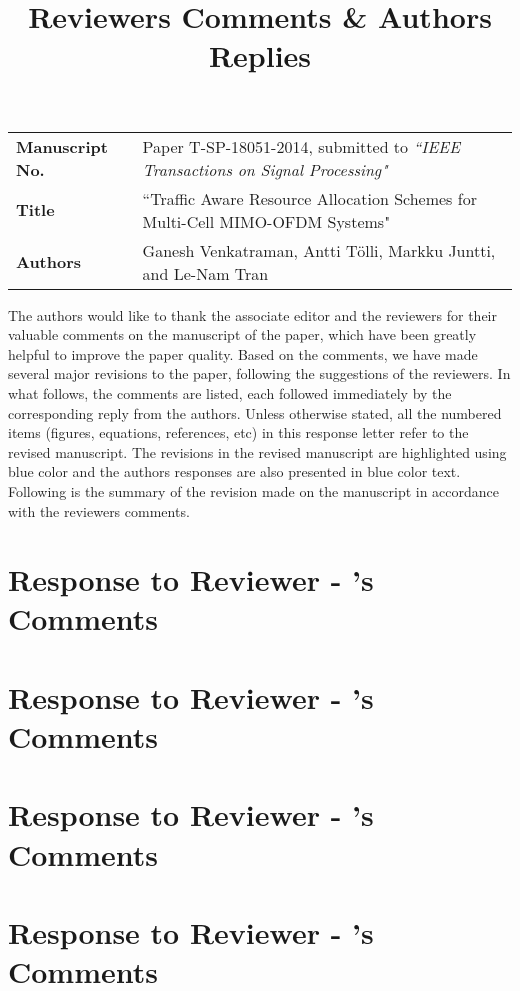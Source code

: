 \documentclass[10pt,letterpaper,onecolumn]{article}
\begin{document}
\title{Reviewers Comments \& Authors Replies}

\date{}
\author{}
\maketitle

\begin{tabular}{p{1.5in}p{4in}}
\textbf{Manuscript No.} & Paper T-SP-18051-2014, submitted to \emph{``IEEE Transactions on Signal Processing"} \\
\textbf{Title} & ``Traffic Aware Resource Allocation Schemes for Multi-Cell MIMO-OFDM Systems" \\
\textbf{Authors} & Ganesh Venkatraman, Antti T\"{o}lli, Markku Juntti, and Le-Nam Tran
\end{tabular}

\vspace{0.5in}
The authors would like to thank the associate editor and the reviewers for their valuable comments on the manuscript of the paper, which have been greatly helpful to improve the paper quality. Based on the comments, we have made several major revisions to the paper, following the suggestions of the reviewers. In what follows, the comments are listed, each followed immediately by the corresponding reply from the authors. Unless otherwise stated, all the numbered items (figures, equations, references, etc) in this response letter refer to the revised manuscript. The revisions in the revised manuscript are highlighted using blue color and the authors responses are also presented in blue color text. Following is the summary of the revision made on the manuscript in accordance with the reviewers comments.


\newpage
\section*{Response to Reviewer - 's Comments}


\newpage
\section*{Response to Reviewer - 's Comments}


\newpage
\section*{Response to Reviewer - 's Comments}


\newpage
\section*{Response to Reviewer - 's Comments}

\end{document}
